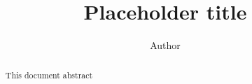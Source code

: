 \documentclass[12pt]{article} %
\title{Placeholder title}
\author{Author}
\affil{Institution}
\begin{document}
\maketitle

\begin{abstract}
  This document abstract
\end{abstract}



\printbibliography[heading=bibintoc]
\end{document}
